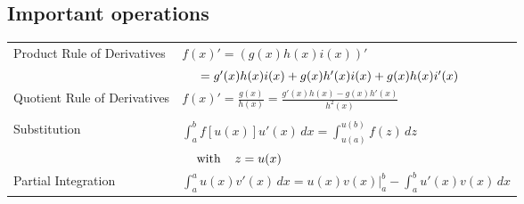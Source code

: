 \egroup


\subsection*{Important operations}
\bgroup
    \def\arraystretch{1.3}
    \begin{tabular}{ll}

        \multirow{2}{*}{Product Rule of Derivatives} &
        $f(x)' = (g(x)h(x)i(x))'$ \\* &
        $\hspace{5mm} = g'(x)h(x)i(x) + g(x)h'(x)i(x) + g(x)h(x)i'(x)$
        \\

        Quotient Rule of Derivatives &
        $f(x)' = \frac{g(x)}{h(x)} = \frac{g'(x)h(x) - g(x)h'(x)}{h^2(x)}$
        \\

        &\\

        \multirow{2}{*}{Substitution} &
        $\int_a^b f[u(x)]u'(x)\,dx = \int_{u(a)}^{u(b)} f(z)\,dz$ \\* &
        $\hspace{4mm}\textrm{with}\hspace{4mm} z = u(x)$
        \\

        Partial Integration &
        $\int_a^a u(x)v'(x)\,dx = u(x)v(x)\rvert_a^b - \int_a^b u'(x)v(x)\,dx$
        \\
    \end{tabular}
\egroup

